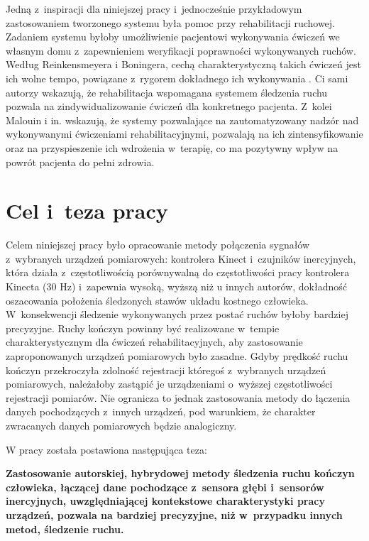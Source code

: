 Jedną z~inspiracji dla niniejszej pracy i~jednocześnie przykładowym zastosowaniem tworzonego systemu była pomoc przy rehabilitacji ruchowej. Zadaniem systemu byłoby umożliwienie pacjentowi wykonywania ćwiczeń we własnym domu z~zapewnieniem weryfikacji poprawności wykonywanych ruchów. Według Reinkensmeyera i Boningera, cechą charakterystyczną takich ćwiczeń jest ich wolne tempo, powiązane z~rygorem dokładnego ich wykonywania  \cite{Reinkensmeyer2012}. Ci sami autorzy wskazują, że rehabilitacja wspomagana systemem śledzenia ruchu pozwala na zindywidualizowanie ćwiczeń dla konkretnego pacjenta. Z~kolei Malouin i in. \cite{Malouin2003} wskazują, że systemy pozwalające na zautomatyzowany nadzór nad wykonywanymi ćwiczeniami rehabilitacyjnymi, pozwalają na ich zintensyfikowanie oraz na przyspieszenie ich wdrożenia w~terapię, co ma pozytywny wpływ na powrót pacjenta do pełni zdrowia.

\section{Cel i~teza pracy}
Celem niniejszej pracy było opracowanie metody połączenia sygnałów z~wybranych urządzeń pomiarowych: kontrolera Kinect i~czujników inercyjnych, która działa z~częstotliwością porównywalną do częstotliwości pracy kontrolera Kinecta (30 Hz) i~zapewnia wysoką, wyższą niż u innych autorów, dokładność oszacowania położenia śledzonych stawów układu kostnego człowieka. W~konsekwencji śledzenie wykonywanych przez postać ruchów byłoby bardziej precyzyjne. Ruchy kończyn powinny być realizowane w~tempie charakterystycznym dla ćwiczeń rehabilitacyjnych, aby zastosowanie zaproponowanych urządzeń pomiarowych było zasadne. Gdyby prędkość ruchu kończyn przekroczyła zdolność rejestracji któregoś z~wybranych urządzeń pomiarowych, należałoby zastąpić je urządzeniami o~wyższej częstotliwości rejestracji pomiarów. Nie ogranicza to jednak zastosowania metody do łączenia danych pochodzących z~innych urządzeń, pod warunkiem, że charakter zwracanych danych pomiarowych będzie analogiczny. 

W pracy została postawiona następująca teza:\\
\begin{center}
	\textbf{Zastosowanie autorskiej, hybrydowej metody śledzenia ruchu kończyn człowieka, łączącej dane pochodzące z~sensora głębi i~sensorów inercyjnych, uwzględniającej kontekstowe charakterystyki pracy urządzeń, pozwala na bardziej precyzyjne, niż w~przypadku innych metod, śledzenie ruchu.}
\end{center}

